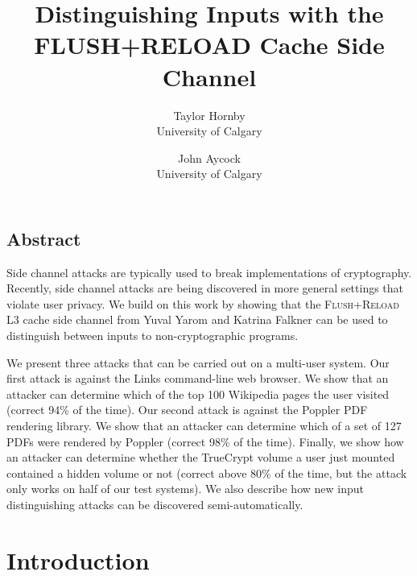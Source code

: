 \documentclass[letterpaper,twocolumn,10pt]{article}
\begin{document}
\date{}

\title{\Large \bf Distinguishing Inputs with the FLUSH+RELOAD Cache Side Channel}

\author{
{\rm Taylor Hornby}\\
University of Calgary
\and
{\rm John Aycock}\\
University of Calgary
} %

\maketitle



\subsection*{Abstract}
Side channel attacks are typically used to break implementations of
cryptography. Recently, side channel attacks are being discovered in more
general settings that violate user privacy. We build on this work by showing
that the \textsc{Flush+Reload} L3 cache side channel from Yuval Yarom and
Katrina Falkner \cite{yarom2013flush} can be used to distinguish between inputs
to non-cryptographic programs. 

We present three attacks that can be carried out on a multi-user system. Our
first attack is against the Links command-line web browser. We show that an
attacker can determine which of the top 100 Wikipedia pages the user visited
(correct 94\% of the time). Our second attack is against the Poppler PDF
rendering library. We show that an attacker can determine which of a set of 127
PDFs were rendered by Poppler (correct 98\% of the time). Finally, we show how
an attacker can determine whether the TrueCrypt volume a user just mounted
contained a hidden volume or not (correct above 80\% of the time, but the attack
only works on half of our test systems). We also describe how new input
distinguishing attacks can be discovered semi-automatically.

\section{Introduction}
\label{sec:intro}
\end{document}
